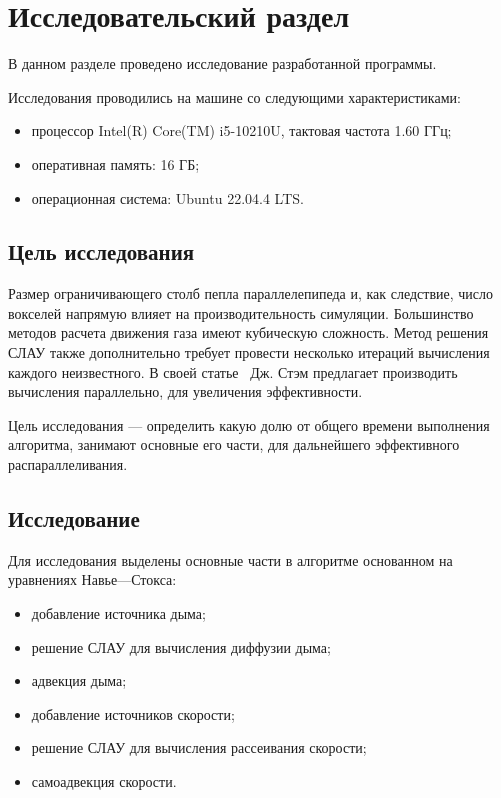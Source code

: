 \chapter{Исследовательский раздел}
В данном разделе проведено исследование разработанной программы.

Исследования проводились на машине со следующими характеристиками:
\begin{itemize}[label=---]
	\item процессор Intel(R) Core(TM) i5-10210U, тактовая частота 1.60 ГГц;
	\item оперативная память: 16 ГБ;
	\item операционная система: Ubuntu 22.04.4 LTS.
\end{itemize}

\section{Цель исследования}

Размер ограничивающего столб пепла параллелепипеда и, как следствие, число вокселей напрямую влияет на производительность симуляции. Большинство методов расчета движения газа имеют кубическую сложность. Метод решения СЛАУ также дополнительно требует провести несколько итераций вычисления каждого неизвестного. В своей статье~\cite{stam} Дж. Стэм предлагает производить вычисления параллельно, для увеличения эффективности.

Цель исследования --- определить какую долю от общего времени выполнения алгоритма, занимают основные его части, для дальнейшего эффективного распараллеливания.

\section{Исследование}

Для исследования выделены основные части в алгоритме основанном на уравнениях Навье---Стокса:
\begin{itemize}
	\item добавление источника дыма;
	\item решение СЛАУ для вычисления диффузии дыма;
	\item адвекция дыма;
	\item добавление источников скорости;
	\item решение СЛАУ для вычисления рассеивания скорости;
	\item самоадвекция скорости.
\end{itemize}

